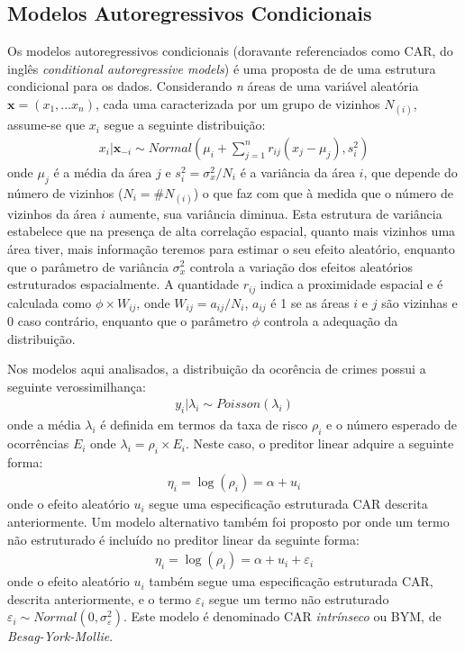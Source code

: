 \documentclass[12pt,openright,oneside,a4paper,english,french,spanish]{abntex2}
\numberwithin{table}{section} %
\numberwithin{figure}{section} %
\newcommand{\co}{\citeonline}
\begin{document}
\subsection{Modelos Autoregressivos Condicionais\label{subsec:CAR_Indice}}

Os modelos autoregressivos condicionais (doravante referenciados como CAR, do inglês \textit{conditional autoregressive models}) é uma proposta de \co{besag1974} de uma estrutura condicional para os dados. Considerando \textit{n} áreas de uma variável aleatória $\boldsymbol{x}=(x_1,...x_n)$, cada uma caracterizada por um grupo de vizinhos $N_{(i)}$, assume-se que $x_i$ segue a seguinte distribuição:
\begin{align}
x_i|\boldsymbol{x}_{-i}\sim Normal\left ( \mu_i+\sum_{j=1}^{n}r_{ij}\left ( x_j-\mu_j \right ),s_{i}^{2} \right )
\end{align}
onde $\mu_j$ é a média da área $j$ e $s_{i}^{2} = \sigma_{x}^{2}/N_i$ é a variância da área $i$, que depende do número de vizinhos ($N_i=\#N_{(i)}$) o que faz com que à medida que o número de vizinhos da área $i$ aumente, sua variância diminua. Esta estrutura de variância estabelece que na presença de alta correlação espacial, quanto mais vizinhos uma área tiver, mais informação teremos para estimar o seu efeito aleatório, enquanto que o parâmetro de variância $\sigma_{x}^{2}$ controla a variação dos efeitos aleatórios estruturados espacialmente. A quantidade $r_{ij}$ indica a proximidade espacial e é calculada como $\phi \times W_{ij}$, onde $W_{ij}=a_{ij}/N_{i}$, $a_{ij}$ é 1 se as áreas $i$ e $j$ são vizinhas e 0 caso contrário, enquanto que o parâmetro $\phi$ controla a adequação da distribuição.

Nos modelos aqui analisados, a distribuição da ocorência de crimes possui a seguinte verossimilhança:
\begin{align}
y_i|\lambda_i\sim Poisson(\lambda_i)
\end{align}
onde a média $\lambda_i$ é definida em termos da taxa de risco $\rho_i$ e o número esperado de ocorrências $E_i$ onde $\lambda_i=\rho_i\times E_i$. Neste caso, o preditor linear adquire a seguinte forma:
\begin{align}
\eta_i = \log (\rho_i)=\alpha + u_i
\end{align}
onde o efeito aleatório $u_i$ segue uma especificação estruturada CAR descrita anteriormente. Um modelo alternativo também foi proposto por \co{besag1991} onde um termo não estruturado é incluído no preditor linear da seguinte forma:
\begin{align}
\eta_i = \log (\rho_i)=\alpha + u_i + \varepsilon_i
\end{align}
onde o efeito aleatório $u_i$ também segue uma especificação estruturada CAR, descrita anteriormente, e o termo $\varepsilon_i$ segue um termo não estruturado $\varepsilon_i \sim Normal\left ( 0,\sigma_{\varepsilon}^{2} \right )$. Este modelo é denominado CAR \textit{intrínseco} ou BYM, de \textit{Besag-York-Mollie}.
\end{document}
